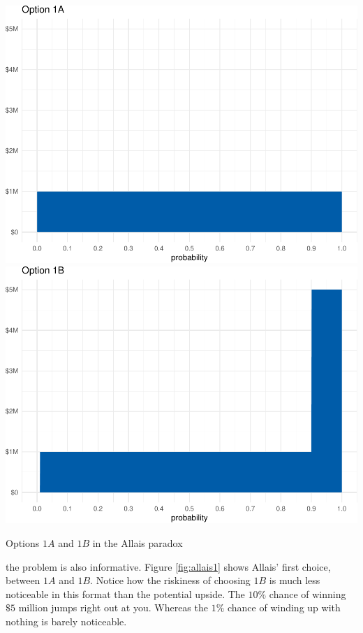 \documentclass[justified]{tufte-book}
\theoremstyle{definition}
\theoremstyle{definition}
\theoremstyle{definition}
\theoremstyle{definition}
\theoremstyle{remark}
\begin{document}
\begin{marginfigure}
\includegraphics{_main_files/figure-latex/allais1-1} \includegraphics{_main_files/figure-latex/allais1-2} \caption[Options $1A$ and $1B$ in the Allais paradox]{Options $1A$ and $1B$ in the Allais paradox}\label{fig:allais1}
\end{marginfigure}

 the problem is also informative. Figure \ref{fig:allais1} shows Allais' first choice, between \(1A\) and \(1B\). Notice how the riskiness of choosing \(1B\) is much less noticeable in this format than the potential upside. The \(10\%\) chance of winning \(\$5\) million jumps right out at you. Whereas the \(1\%\) chance of winding up with nothing is barely noticeable.
\end{document}
